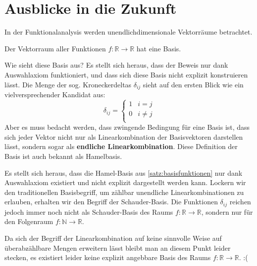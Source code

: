 \documentclass{report}
\newcommand*{\newpar}{\par\vspace{\baselineskip}\noindent}
\newcommand{\tbf}[1]{\textbf{#1}}
\newcommand{\bN}{\mathbb{N}}
\newcommand{\bR}{\mathbb{R}}
\begin{document}
%
%
%
%
%
%
%
%
%
%
%
%
%
%
%
%
%
%
%
%
%
%
%
%
%
%
%
%
%
%
%
%
%
%
%
\appendix
\chapter{Ausblicke in die Zukunft}
In der Funktionalanalysis werden unendlichdimensionale Vektorräume betrachtet. 
\begin{theorem}
\label{satz:basisfunktionen}
Der Vektorraum aller Funktionen $f: \bR \to \bR$ hat eine Basis.
\end{theorem}
\newpar
Wie sieht diese Basis aus? Es stellt sich heraus, dass der Beweis nur dank Auswahlaxiom funktioniert, und dass sich diese Basis nicht explizit konstruieren lässt. Die Menge der sog. Kroneckerdeltas $\delta_{ij}$ sieht auf den ersten Blick wie ein vielversprechender Kandidat aus:
\begin{equation*}
 \delta_{ij} = \begin{cases}
            1 & i = j\\
            0 & i \neq j\\
           \end{cases}
\end{equation*}
Aber es muss bedacht werden, dass zwingende Bedingung für eine Basis ist, dass sich jeder Vektor nicht nur als Linearkombination der Basisvektoren darstellen lässt, sondern sogar als \tbf{endliche Linearkombination}. Diese Definition der Basis ist auch bekannt als Hamelbasis.
\newpar
Es stellt sich heraus, dass die Hamel-Basis aus \ref{satz:basisfunktionen} nur dank Auswahlaxiom existiert und nicht explizit dargestellt werden kann. Lockern wir den traditionellen Basisbegriff, um zählbar unendliche Linearkombinationen zu erlauben, erhalten wir den Begriff der Schauder-Basis. Die Funktionen $\delta_{ij}$ reichen jedoch immer noch nicht als Schauder-Basis des Raums $f: \bR \to \bR$, sondern nur für den Folgenraum $f: \bN \to \bR$. 
\newpar
Da sich der Begriff der Linearkombination auf keine sinnvolle Weise auf überabzählbare Mengen erweitern lässt bleibt man an diesem Punkt leider stecken, es existiert leider keine explizit angebbare Basis des Raums $f: \bR \to \bR$. :(
\end{document}
